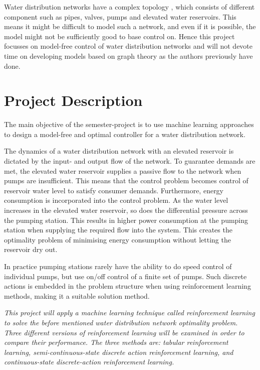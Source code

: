Water distribution networks have a complex topology \cite{MathiasJeppe730,Rathore1030}, which consists of different component such as pipes, valves, pumps and elevated water reservoirs. This means it might be difficult to model such a network, and even if it is possible, the model might not be sufficiently good to base control on. Hence this project focusses on model-free control of water distribution networks and will not devote time on developing models based on graph theory as the authors previously have done. 

\section{Project Description}\label{sec:projectDescription} 

The main objective of the semester-project is to use machine learning approaches to design a model-free and optimal controller for a water distribution network.

The dynamics of a water distribution network with an elevated reservoir is dictated by the input- and output flow of the network. To guarantee demands are met, the elevated water reservoir supplies a passive flow to the network when pumps are insufficient. This means that the control problem becomes control of reservoir water level to satisfy consumer demands. Furthermore, energy consumption is incorporated into the control problem. As the water level increases in the elevated water reservoir, so does the differential pressure across the pumping station. This results in higher power consumption at the pumping station when supplying the required flow into the system. This creates the optimality problem of minimising energy consumption without letting the reservoir dry out. 

In practice pumping stations rarely have the ability to do speed control of individual pumps, but use on/off control of a finite set of pumps. Such discrete actions is embedded in the problem structure when using reinforcement learning methods, making it a suitable solution method.

\textit{This project will apply a machine learning technique called reinforcement learning to solve the before mentioned water distribution network optimality problem. Three different versions of reinforcement learning will be examined in order to compare their performance. The three methods are: tabular reinforcement learning, semi-continuous-state discrete action reinforcement learning, and continuous-state discrete-action reinforcement learning.}

